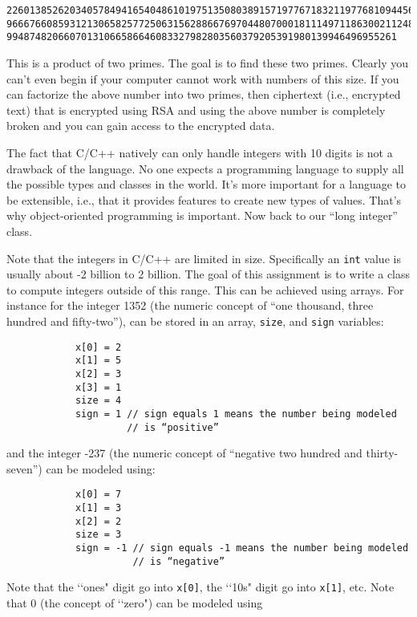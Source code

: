 \begin{Verbatim}
2260138526203405784941654048610197513508038915719776718321197768109445641817
9666766085931213065825772506315628866769704480700018111497118630021124879281
99487482066070131066586646083327982803560379205391980139946496955261
\end{Verbatim}

This is a product of two primes. The goal is to find these two primes. Clearly 
you can't even begin if your computer cannot work with numbers of this size. If 
you can factorize the above number into two primes, then ciphertext (i.e., 
encrypted text) that is encrypted using RSA and using the above number is 
completely broken and you can gain access to the encrypted data.

The fact that C/C++ natively can only handle integers with 10 digits is not a 
drawback of the language. No one expects a programming language to supply all 
the possible types and classes in the world. It's more important for a language 
to be extensible, i.e., that it provides features to create new types of values. 
That's why object-oriented programming is important.
Now back to our “long integer” class.

Note that the integers in C/C++ are limited in size. Specifically an \verb!int! 
value is usually about -2 billion to 2 billion. The goal of this 
assignment is to write a class to compute integers outside of this range. 
This can be achieved using arrays. For instance for the integer 1352 (the 
numeric concept of “one thousand, three hundred and fifty-two”), can be 
stored in an array, \verb!size!, and \verb!sign! variables:

\begin{Verbatim}
            x[0] = 2
            x[1] = 5
            x[2] = 3
            x[3] = 1
            size = 4
            sign = 1 // sign equals 1 means the number being modeled 
                     // is “positive”
\end{Verbatim}

and the integer -237 (the numeric concept of “negative two hundred and thirty-seven”) 
can be modeled using:

\begin{Verbatim}
            x[0] = 7
            x[1] = 3
            x[2] = 2
            size = 3
            sign = -1 // sign equals -1 means the number being modeled 
                      // is “negative”
\end{Verbatim}

Note that the \lq\lq ones" digit go into \verb!x[0]!, the
\lq\lq 10s" digit go into 
\verb!x[1]!, etc. Note that 0 (the concept of \lq\lq zero")
can be modeled using

